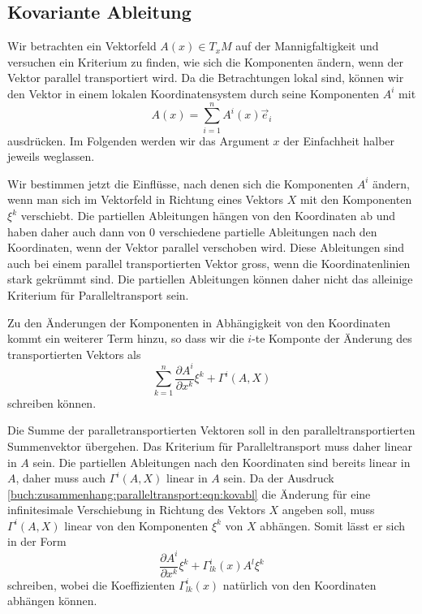 %
%
\subsection{Kovariante Ableitung
\label{buch:zusammenhang:subsection:paralleltransport}}
Wir betrachten ein Vektorfeld $A(x)\in T_xM$ auf der Mannigfaltigkeit 
und versuchen ein Kriterium zu finden, wie sich die Komponenten
ändern, wenn der Vektor parallel transportiert wird.
Da die Betrachtungen lokal sind, können wir den Vektor in einem
lokalen Koordinatensystem durch seine Komponenten $A^i$ mit
\[
A(x) = \sum_{i=1}^n A^i(x)\vec{e}_i
\]
ausdrücken.
Im Folgenden werden wir das Argument $x$ der Einfachheit halber
jeweils weglassen.

Wir bestimmen jetzt die Einflüsse, nach denen sich die Komponenten
$A^i$ ändern, wenn man sich im Vektorfeld in Richtung eines
Vektors $X$ mit den Komponenten $\xi^k$ verschiebt.
Die partiellen Ableitungen hängen von den Koordinaten ab und haben
daher auch dann von $0$ verschiedene partielle Ableitungen nach
den Koordinaten, wenn der Vektor parallel verschoben wird.
Diese Ableitungen sind auch bei einem parallel transportierten
Vektor gross, wenn die Koordinatenlinien stark gekrümmt sind.
Die partiellen Ableitungen können daher nicht das alleinige Kriterium
für Paralleltransport sein.

Zu den Änderungen der Komponenten in Abhängigkeit von den Koordinaten
kommt ein weiterer Term hinzu, so dass wir die $i$-te Komponte der Änderung
des transportierten Vektors als
\begin{equation}
\sum_{k=1}^n
\frac{\partial A^i}{\partial x^k}
\xi^k
+
\Gamma^i(A,X)
\label{buch:zusammenhang:paralleltransport:eqn:kovabl}
\end{equation}
schreiben können.

Die Summe der paralletransportierten Vektoren soll in den
paralleltransportierten Summenvektor übergehen.
Das Kriterium für Paralleltransport muss daher linear in $A$ sein.
Die partiellen Ableitungen nach den Koordinaten sind bereits linear
in $A$, daher muss auch $\Gamma^i(A,X)$ linear in $A$ sein.
Da der Ausdruck
\eqref{buch:zusammenhang:paralleltransport:eqn:kovabl}
die Änderung für eine infinitesimale Verschiebung in Richtung
des Vektors $X$ angeben soll, muss $\Gamma^i(A,X)$ linear
von den Komponenten $\xi^k$ von $X$ abhängen.
Somit lässt er sich in der Form
\begin{equation}
\frac{\partial A^i}{\partial x^k}\xi^k
+
\Gamma^i_{lk}(x)A^l\xi^k
\end{equation}
schreiben, wobei die Koeffizienten $\Gamma^i_{lk}(x)$ natürlich
von den Koordinaten abhängen können.

